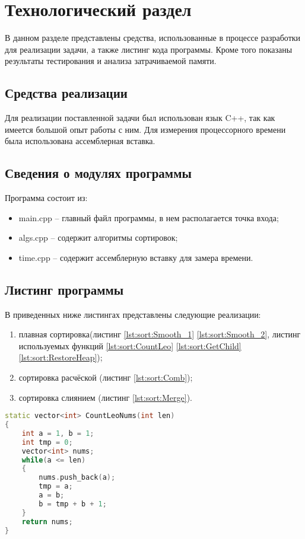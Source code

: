 \chapter{Технологический раздел}
\label{cha:technological}

    В данном разделе представлены средства, использованные в процессе разработки для реализации задачи, а также листинг кода программы. Кроме того показаны результаты тестирования и анализа затрачиваемой памяти.

    \section{Средства реализации}
        Для реализации поставленной задачи был использован язык C++, так как имеется большой опыт работы с ним. Для измерения процессорного времени была использована ассемблерная вставка. 

    \section{Сведения о модулях программы}
    \par Программа состоит из:
    \begin{itemize}
        \item main.cpp -- главный файл программы, в нем располагается точка входа;
        \item algs.cpp -- содержит алгоритмы сортировок;
        \item time.cpp -- содержит ассемблерную вставку для замера времени.
    \end{itemize}

    \section{Листинг программы}
        В приведенных ниже листингах представлены следующие реализации: 
        \begin{enumerate}
            \item плавная сортировка(листинг \ref{lst:sort:Smooth_1} \ref{lst:sort:Smooth_2}, листинг используемых функций \ref{lst:sort:CountLeo} \ref{lst:sort:GetChild} \ref{lst:sort:RestoreHeap});
            \item сортировка расчёской (листинг \ref{lst:sort:Comb});
            \item сортировка слиянием (листинг \ref{lst:sort:Merge}).
        \end{enumerate}
        \par \text{           }
        \begin{lstlisting}[language=C++, label=lst:sort:CountLeo, caption=Функция создания массива чисел Леонардо]
static vector<int> CountLeoNums(int len)
{
    int a = 1, b = 1;
    int tmp = 0;
    vector<int> nums;
    while(a <= len)
    {
        nums.push_back(a);
        tmp = a;
        a = b;
        b = tmp + b + 1;
    }
    return nums;
}
        \end{lstlisting}

